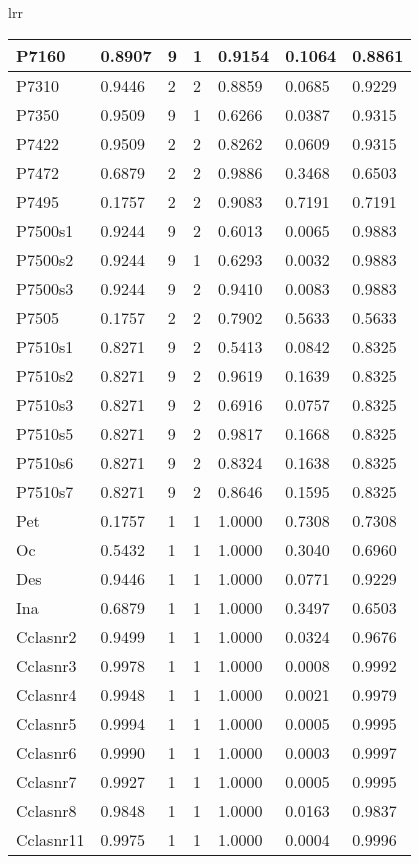 \begin{table}[H]
\begin{tabular}{lrr}
\begin{table}[!ht]
\begin{tabular}{|l|l|l|l|l|l|l|}
        P7160 & 0.8907 & 9 & 1 & 0.9154 & 0.1064 & 0.8861 \\ \hline
        P7310 & 0.9446 & 2 & 2 & 0.8859 & 0.0685 & 0.9229 \\ \hline
        P7350 & 0.9509 & 9 & 1 & 0.6266 & 0.0387 & 0.9315 \\ \hline
        P7422 & 0.9509 & 2 & 2 & 0.8262 & 0.0609 & 0.9315 \\ \hline
        P7472 & 0.6879 & 2 & 2 & 0.9886 & 0.3468 & 0.6503 \\ \hline
        P7495 & 0.1757 & 2 & 2 & 0.9083 & 0.7191 & 0.7191 \\ \hline
        P7500s1 & 0.9244 & 9 & 2 & 0.6013 & 0.0065 & 0.9883 \\ \hline
        P7500s2 & 0.9244 & 9 & 1 & 0.6293 & 0.0032 & 0.9883 \\ \hline
        P7500s3 & 0.9244 & 9 & 2 & 0.9410 & 0.0083 & 0.9883 \\ \hline
        P7505 & 0.1757 & 2 & 2 & 0.7902 & 0.5633 & 0.5633 \\ \hline
        P7510s1 & 0.8271 & 9 & 2 & 0.5413 & 0.0842 & 0.8325 \\ \hline
        P7510s2 & 0.8271 & 9 & 2 & 0.9619 & 0.1639 & 0.8325 \\ \hline
        P7510s3 & 0.8271 & 9 & 2 & 0.6916 & 0.0757 & 0.8325 \\ \hline
        P7510s5 & 0.8271 & 9 & 2 & 0.9817 & 0.1668 & 0.8325 \\ \hline
        P7510s6 & 0.8271 & 9 & 2 & 0.8324 & 0.1638 & 0.8325 \\ \hline
        P7510s7 & 0.8271 & 9 & 2 & 0.8646 & 0.1595 & 0.8325 \\ \hline
        Pet & 0.1757 & 1 & 1 & 1.0000 & 0.7308 & 0.7308 \\ \hline
        Oc & 0.5432 & 1 & 1 & 1.0000 & 0.3040 & 0.6960 \\ \hline
        Des & 0.9446 & 1 & 1 & 1.0000 & 0.0771 & 0.9229 \\ \hline
        Ina & 0.6879 & 1 & 1 & 1.0000 & 0.3497 & 0.6503 \\ \hline
        Cclasnr2 & 0.9499 & 1 & 1 & 1.0000 & 0.0324 & 0.9676 \\ \hline
        Cclasnr3 & 0.9978 & 1 & 1 & 1.0000 & 0.0008 & 0.9992 \\ \hline
        Cclasnr4 & 0.9948 & 1 & 1 & 1.0000 & 0.0021 & 0.9979 \\ \hline
        Cclasnr5 & 0.9994 & 1 & 1 & 1.0000 & 0.0005 & 0.9995 \\ \hline
        Cclasnr6 & 0.9990 & 1 & 1 & 1.0000 & 0.0003 & 0.9997 \\ \hline
        Cclasnr7 & 0.9927 & 1 & 1 & 1.0000 & 0.0005 & 0.9995 \\ \hline
        Cclasnr8 & 0.9848 & 1 & 1 & 1.0000 & 0.0163 & 0.9837 \\ \hline
        Cclasnr11 & 0.9975 & 1 & 1 & 1.0000 & 0.0004 & 0.9996 \\ \hline
    \end{tabular}
\end{table}
\bottomrule
\end{tabular}
\end{table}

